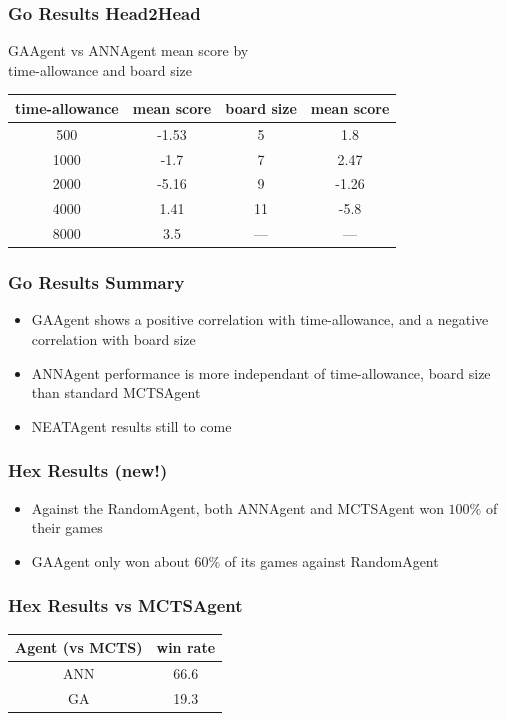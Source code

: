 \documentclass{beamer}
\begin{document}
\begin{frame}
\frametitle{Go Results Head2Head}
\begin{center}
GAAgent vs ANNAgent mean score by \\time-allowance and board size

\begin{tabular}{|c|c|||c|c|}
\hline
time-allowance & mean score & board size & mean score \\ \hline \hline
500 & -1.53 & 5 & 1.8\\ \hline
1000 & -1.7 & 7 & 2.47\\ \hline
2000 & -5.16 & 9 & -1.26\\ \hline
4000 & 1.41 & 11 & -5.8\\ \hline
8000 & 3.5 & --- & ---\\ \hline
\end{tabular}
\end{center}
\end{frame}

\begin{frame}
\frametitle{Go Results Summary}
\begin{itemize}
 \item GAAgent shows a positive correlation with time-allowance, and a negative correlation with board size
 \item ANNAgent performance is more independant of time-allowance, board size than standard MCTSAgent
 \item NEATAgent results still to come
\end{itemize}
\end{frame}

\begin{frame}
\frametitle{Hex Results (new!)}
\begin{itemize}
 \item Against the RandomAgent, both ANNAgent and MCTSAgent won $100\%$ of their games
 \item GAAgent only won about $60\%$ of its games against RandomAgent
\end{itemize}
\end{frame}

\begin{frame}
\frametitle{Hex Results vs MCTSAgent}
\begin{center}
\begin{tabular}{|c|c|}
\hline
Agent (vs MCTS) & win rate \\ \hline \hline
ANN & 66.6 \\ \hline
GA & 19.3 \\ \hline
\end{tabular}
\end{center}
\end{frame}
\end{document}
